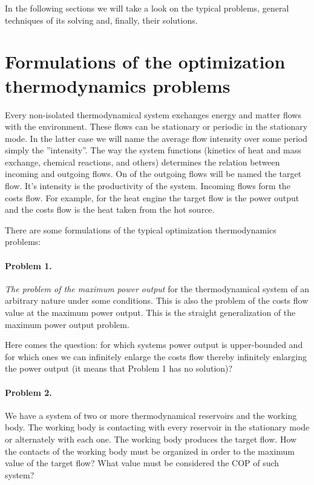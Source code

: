 \documentclass[epjST]{svjour}
\begin{document}
In the following sections we will take a look on the typical problems, general techniques of its solving and, finally, their solutions.

\section{Formulations of the optimization thermodynamics problems}

Every non-isolated thermodynamical system exchanges energy and matter flows with the environment. These flows can be stationary or periodic in the stationary mode. In the latter case we will name the average flow intensity over some period simply the ''intensity''. The way the system functions (kinetics of heat and mass exchange, chemical reactions, and others) determines the relation between incoming and outgoing flows. On of the outgoing flows will be named the target flow. It's intensity is the productivity of the system. Incoming flows form the costs flow. For example, for the heat engine the target flow is the power output and the costs flow is the heat taken from the hot source.

There are some formulations of the typical optimization thermodynamics problems:

\paragraph{Problem 1.} \textit{The problem of the maximum power output} for the thermodynamical system of an arbitrary nature under some conditions. This is also the problem of the costs flow value at the maximum power output. This is the straight generalization of the maximum power output problem.

Here comes the question: for which systems power output is upper-bounded and for which ones we can infinitely enlarge the costs flow thereby infinitely enlarging the power output (it means that Problem 1 has no solution)?

\paragraph{Problem 2.} We have a system of two or more thermodynamical reservoirs and the working body. The working body is contacting with every reservoir in the stationary mode or alternately with each one. The working body produces the target flow. How the contacts of the working body must be organized in order to the maximum value of the target flow? What value must be considered the COP of such system?
\end{document}
